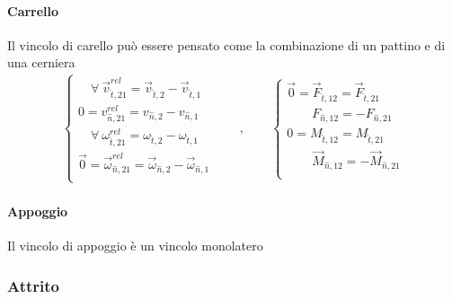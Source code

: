 \documentclass[letterpaper,10pt,italian]{jupyterBook}
\begin{document}
\paragraph{Carrello}
\label{\detokenize{ch/mechanics/actions-examples:carrello}}\label{\detokenize{ch/mechanics/actions-examples:physics-hs-mechanics-actions-contact-ideal-constraints-cart}}
\sphinxAtStartPar
Il vincolo di carello può essere pensato come la combinazione di un pattino e di una cerniera
\begin{equation*}
\begin{split}
\begin{cases}
  \quad \forall \ \vec{v}^{rel}_{\hat{t},21}     = \vec{v}_{\hat{t},2}     - \vec{v}_{\hat{t},1} \\
          0  = v^{rel}_{\hat{n},21}     = v_{\hat{n},2}     - v_{\hat{n},1} \\
  \quad \forall \ \omega^{rel}_{\hat{t},21} = \omega_{\hat{t},2} - \omega_{\hat{t},1} \\
  \vec{0} = \vec{\omega}^{rel}_{\hat{n},21} = \vec{\omega}_{\hat{n},2} - \vec{\omega}_{\hat{n},1} \\
\end{cases}
\qquad , \qquad
\begin{cases}
  \vec{0} = \vec{F}_{\hat{t},12} = \vec{F}_{\hat{t},21} \\
  \qquad F_{\hat{n},12} = - F_{\hat{n},21} \\
  0 =  M_{\hat{t},12} = M_{\hat{t},21} \\
  \qquad \vec{M}_{\hat{n},12} = - \vec{M}_{\hat{n},21} \\
\end{cases}
\end{split}
\end{equation*}

\paragraph{Appoggio}
\label{\detokenize{ch/mechanics/actions-examples:appoggio}}\label{\detokenize{ch/mechanics/actions-examples:physics-hs-mechanics-actions-contact-ideal-constraints-monolateral}}
\sphinxAtStartPar
Il vincolo di appoggio è un vincolo monolatero  


\subsubsection{Attrito}
\label{\detokenize{ch/mechanics/actions-examples:attrito}}\label{\detokenize{ch/mechanics/actions-examples:physics-hs-mechanics-actions-contact-friction}}
\end{document}
